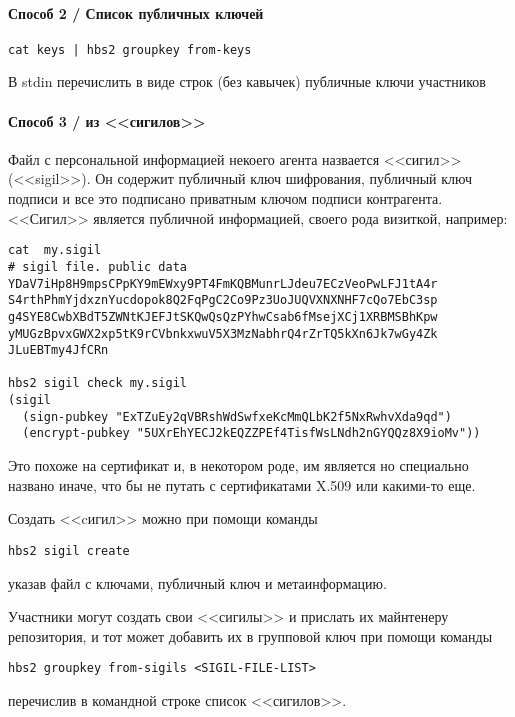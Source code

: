 \documentclass[11pt,a4paper]{article}
\begin{document}
\paragraph{Способ 2 / Список публичных ключей}

\begin{verbatim}
cat keys | hbs2 groupkey from-keys
\end{verbatim}

В stdin перечислить в виде строк (без кавычек) публичные ключи участников

\paragraph{Способ 3 / из <<сигилов>>}

Файл с персональной информацией некоего агента назвается <<сигил>> (<<sigil>>).
Он содержит публичный ключ шифрования, публичный ключ подписи и все это подписано
приватным ключом подписи контрагента. <<Сигил>> является публичной информацией,
своего рода визиткой, например:

\begin{verbatim}
cat  my.sigil
# sigil file. public data
YDaV7iHp8H9mpsCPpKY9mEWxy9PT4FmKQBMunrLJdeu7ECzVeoPwLFJ1tA4r
S4rthPhmYjdxznYucdopok8Q2FqPgC2Co9Pz3UoJUQVXNXNHF7cQo7EbC3sp
g4SYE8CwbXBdT5ZWNtKJEFJtSKQwQsQzPYhwCsab6fMsejXCj1XRBMSBhKpw
yMUGzBpvxGWX2xp5tK9rCVbnkxwuV5X3MzNabhrQ4rZrTQ5kXn6Jk7wGy4Zk
JLuEBTmy4JfCRn

hbs2 sigil check my.sigil
(sigil
  (sign-pubkey "ExTZuEy2qVBRshWdSwfxeKcMmQLbK2f5NxRwhvXda9qd")
  (encrypt-pubkey "5UXrEhYECJ2kEQZZPEf4TisfWsLNdh2nGYQQz8X9ioMv"))

\end{verbatim}

Это похоже на сертификат и, в некотором роде, им является но специально названо иначе, что бы не
путать с сертификатами X.509 или какими-то еще.

Создать <<cигил>> можно при помощи команды

\texttt{hbs2 sigil create}

указав файл с ключами, публичный ключ и метаинформацию.

Участники могут создать свои <<сигилы>> и прислать их майнтенеру репозитория,
и тот может добавить их в групповой ключ при помощи команды

\texttt{hbs2 groupkey from-sigils <SIGIL-FILE-LIST>}

перечислив в командной строке список <<сигилов>>.
\end{document}
